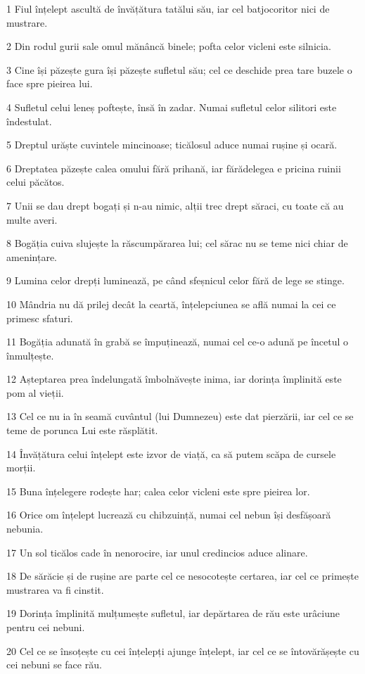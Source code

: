 \par 1 Fiul înțelept ascultă de învățătura tatălui său, iar cel batjocoritor nici de mustrare.
\par 2 Din rodul gurii sale omul mănâncă binele; pofta celor vicleni este silnicia.
\par 3 Cine își păzește gura își păzește sufletul său; cel ce deschide prea tare buzele o face spre pieirea lui.
\par 4 Sufletul celui leneș poftește, însă în zadar. Numai sufletul celor silitori este îndestulat.
\par 5 Dreptul urăște cuvintele mincinoase; ticălosul aduce numai rușine și ocară.
\par 6 Dreptatea păzește calea omului fără prihană, iar fărădelegea e pricina ruinii celui păcătos.
\par 7 Unii se dau drept bogați și n-au nimic, alții trec drept săraci, cu toate că au multe averi.
\par 8 Bogăția cuiva slujește la răscumpărarea lui; cel sărac nu se teme nici chiar de amenințare.
\par 9 Lumina celor drepți luminează, pe când sfeșnicul celor fără de lege se stinge.
\par 10 Mândria nu dă prilej decât la ceartă, înțelepciunea se află numai la cei ce primesc sfaturi.
\par 11 Bogăția adunată în grabă se împuținează, numai cel ce-o adună pe încetul o înmulțește.
\par 12 Așteptarea prea îndelungată îmbolnăvește inima, iar dorința împlinită este pom al vieții.
\par 13 Cel ce nu ia în seamă cuvântul (lui Dumnezeu) este dat pierzării, iar cel ce se teme de porunca Lui este răsplătit.
\par 14 Învățătura celui înțelept este izvor de viață, ca să putem scăpa de cursele morții.
\par 15 Buna înțelegere rodește har; calea celor vicleni este spre pieirea lor.
\par 16 Orice om înțelept lucrează cu chibzuință, numai cel nebun își desfășoară nebunia.
\par 17 Un sol ticălos cade în nenorocire, iar unul credincios aduce alinare.
\par 18 De sărăcie și de rușine are parte cel ce nesocotește certarea, iar cel ce primește mustrarea va fi cinstit.
\par 19 Dorința împlinită mulțumește sufletul, iar depărtarea de rău este urâciune pentru cei nebuni.
\par 20 Cel ce se însoțește cu cei înțelepți ajunge înțelept, iar cel ce se întovărășește cu cei nebuni se face rău.
